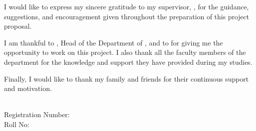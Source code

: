 \clearpage
{}

I would like to express my sincere gratitude to my supervisor, \SupervisorName, for the guidance, suggestions, and encouragement given throughout the preparation of this project proposal.

I am thankful to \HODName, Head of the Department of \DepartmentName, and to \CollegeName{} for giving me the opportunity to work on this project. I also thank all the faculty members of the department for the knowledge and support they have provided during my studies.

Finally, I would like to thank my family and friends for their continuous support and motivation.

\vspace{18pt}
\begin{flushleft}
\singlespacing
\StudentName\\
Registration Number: \RegNo\\
Roll No: \RollNo\\
\SubmissionDate
\end{flushleft}
